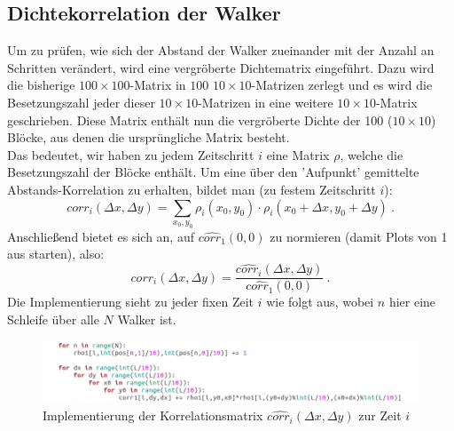 \documentclass[a4paper, 12pt]{report}
\begin{document}
\subsection{Dichtekorrelation der Walker}
\noindent Um zu prüfen, wie sich der Abstand der Walker zueinander mit der Anzahl an Schritten verändert, wird eine vergröberte Dichtematrix eingeführt. Dazu wird die bisherige $100\times 100$-Matrix in $100$ $10\times 10$-Matrizen zerlegt und es wird die Besetzungszahl jeder dieser $10\times 10$-Matrizen in eine weitere $10\times 10$-Matrix geschrieben. Diese Matrix enthält nun die vergröberte Dichte der 100 ($10\times 10$) Blöcke, aus denen die ursprüngliche Matrix besteht. 
\\
\noindent Das bedeutet, wir haben zu jedem Zeitschritt $i$ eine Matrix $\rho$, welche die Besetzungszahl der Blöcke enthält. Um eine über den 'Aufpunkt' gemittelte Abstands-Korrelation zu erhalten, bildet man (zu festem Zeitschritt $i$):
\begin{equation}
\hat{corr_i}(\Delta x,\Delta y) = \sum_{x_0,y_0}\rho_i(x_0,y_0)\cdot\rho_i(x_0+\Delta x,y_0+\Delta y)\ .
\end{equation}
Anschließend bietet es sich an, auf $\hat{corr_1}(0,0)$ zu normieren (damit Plots von 1 aus starten), also:
\begin{equation}
corr_i(\Delta x,\Delta y) = \frac{ \hat{corr_i}(\Delta x,\Delta y) }{ \hat{corr_1}(0,0) } \ .
\end{equation}
Die Implementierung sieht zu jeder fixen Zeit $i$ wie folgt aus, wobei $n$ hier eine Schleife über alle $N$ Walker ist.
\vspace{0.3cm}
\begin{figure}[H]
	\centering
	\includegraphics[scale=0.7]{corrcode.png}
	\caption{Implementierung der Korrelationsmatrix $\hat{corr_i}(\Delta x,\Delta y)$ zur Zeit $i$}
\end{figure}

\newpage
\end{document}
